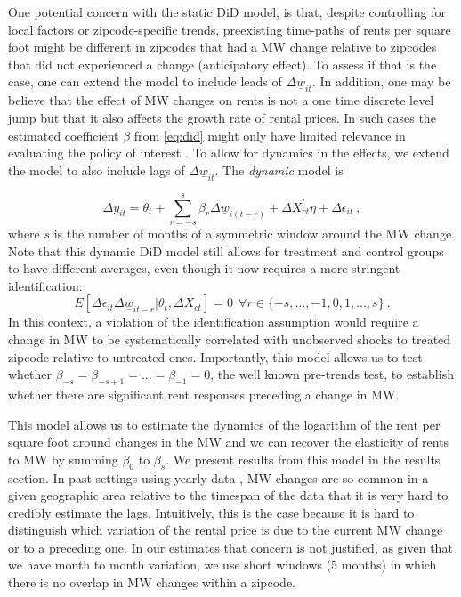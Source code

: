 One potential concern with the static DiD model, is that, despite controlling for local factors or zipcode-specific 
trends, preexisting time-paths of rents per square foot might be different in zipcodes that 
had a MW change relative to zipcodes that did not experienced a change (anticipatory effect). To assess if that is the 
case, one can extend the model to include leads of $\Delta \underline{w}_{it}$. In addition, one 
may be believe that the effect of MW changes on rents is not a one time discrete level jump but that 
it also affects the growth rate of rental prices. In such cases the estimated coefficient $\beta$ 
from \autoref{eq:did} might only have limited relevance in evaluating the policy of interest 
\parencite{callaway2019difference}. To allow for dynamics in the effects, we extend the model to 
also include lags of $\Delta \underline{w}_{it}$. The \textit{dynamic} model is

\begin{equation}\label{eq:leads_lags}
    \Delta y_{it} = \theta_t + \sum_{r=-s}^{s}\beta_r \Delta \underline{w}_{i(t-r)} 
    				+  \Delta X^{'}_{ct}\eta
    				+ \Delta \epsilon_{it} \ ,
\end{equation}
where $s$ is the number of months of a symmetric window around the MW change. Note that this 
dynamic DiD model still allows for treatment and control groups to have different averages, even though 
it now requires a more stringent identification: 
\[E \left[ \Delta \epsilon_{it} \Delta \underline{w}_{it-r} \big| \theta_{t}, \Delta X_{ct} \right] = 0
	\ \ \forall r\in\{-s, ..., -1, 0, 1, ..., s\} \ . \] 
In this context, a violation of the identification assumption would require a change in MW to be 
systematically correlated with unobserved shocks to treated zipcode relative to untreated ones. 
Importantly, this model allows us to test whether $\beta_{-s} = \beta_{-s+1} = ... = \beta_{-1} = 0$, 
the well known pre-trends test, to establish whether there are significant rent responses preceding 
a change in MW. 
%

This model allows us to estimate the dynamics of the logarithm of the rent per square foot around 
changes in the MW and we can recover the elasticity of rents to MW by summing $\beta_0$ to 
$\beta_{s}$. We present results from this model in the results section. In past settings using 
yearly data \parencite{Tidemann2018, Yamagishi2019}, MW changes are so common in a given 
geographic area relative to the timespan of the data that it is very hard to credibly estimate the 
lags. Intuitively, this is the case because it is hard to distinguish which variation of the rental 
price is due to the current MW change or to a preceding one. In our estimates that concern is not 
justified, as given that we have month to month variation, we use short windows (5 months) in which 
there is no overlap in MW changes within a zipcode. 

